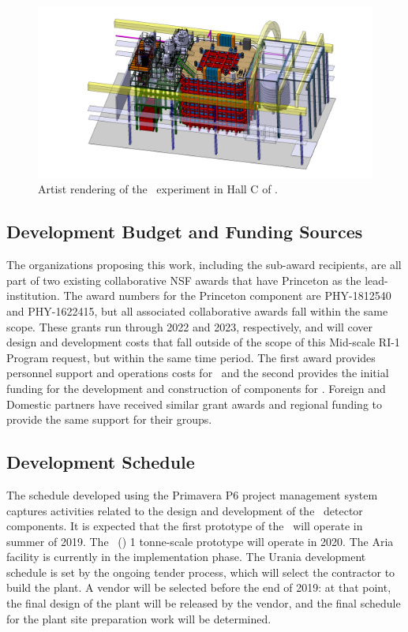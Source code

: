 \begin{figure}[htbp!]
\includegraphics[width=\textwidth]{./Figures/DSk-Overall_Carlini_new.png}
\caption[Artist rendering of the \DSks\ experiment in Hall C of \LNGS]{Artist rendering of the \DSks\ experiment in Hall C of \LNGS.}
\label{fig:Overall-Design}
\end{figure}


\subsection{Development Budget and Funding Sources}
The organizations proposing this work, including the sub-award recipients, are all part of two existing collaborative NSF awards that have Princeton as the lead-institution.  The award numbers for the Princeton component are PHY-1812540 and PHY-1622415, but all associated collaborative awards fall within the same scope.  These grants run through 2022 and 2023, respectively, and will cover design and development costs that fall outside of the scope of this Mid-scale RI-1 Program request, but within the same time period.  The first award provides personnel support and operations costs for \DSks\ and the second provides the initial funding for the development and construction of components for \DSks.  Foreign and Domestic partners have received similar grant awards and regional funding to provide the same support for their groups.


\subsection{Development Schedule}
The schedule developed using the Primavera P6 project management system captures activities related to the design and development of the \DSks\ detector components.  It is expected that the first prototype of the \TPC\ will operate in summer of 2019. The \DSp\ (\DSps) 1 tonne-scale prototype will operate in 2020. The Aria facility is currently  in the implementation phase.  The Urania development schedule is set by the ongoing tender process, which will select the contractor to build the plant. A vendor will be selected before the end of 2019: at that point, the final design of the plant will be released by the vendor, and the final schedule for the plant site preparation work will be determined.